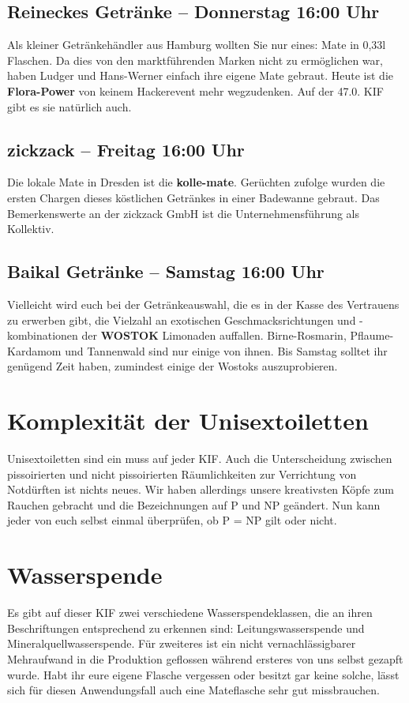 \subsection*{Reineckes Getränke -- Donnerstag 16:00 Uhr}
Als kleiner Getränkehändler aus Hamburg wollten Sie nur eines: Mate in 0,33l Flaschen.
Da dies von den marktführenden Marken nicht zu ermöglichen war, haben Ludger und Hans-Werner einfach ihre eigene Mate gebraut.
Heute ist die \textbf{Flora-Power} von keinem Hackerevent mehr wegzudenken.
Auf der 47.0. KIF gibt es sie natürlich auch.

\subsection*{zickzack -- Freitag 16:00 Uhr}
Die lokale Mate in Dresden ist die \textbf{kolle-mate}.
Gerüchten zufolge wurden die ersten Chargen dieses köstlichen Getränkes in einer Badewanne gebraut.
Das Bemerkenswerte an der zickzack GmbH ist die Unternehmensführung als Kollektiv.

\subsection*{Baikal Getränke -- Samstag 16:00 Uhr}
Vielleicht wird euch bei der Getränkeauswahl, die es in der Kasse des Vertrauens zu erwerben gibt, die Vielzahl an exotischen Geschmacksrichtungen und -kombinationen der \textbf{WOSTOK} Limonaden auffallen.
Birne-Rosmarin, Pflaume-Kardamom und Tannenwald sind nur einige von ihnen.
Bis Samstag solltet ihr genügend Zeit haben, zumindest einige der Wostoks auszuprobieren.

\section*{Komplexität der Unisextoiletten}
Unisextoiletten sind ein muss auf jeder KIF. Auch die Unterscheidung zwischen pissoirierten und nicht pissoirierten Räumlichkeiten zur Verrichtung von Notdürften ist nichts neues.
Wir haben allerdings unsere kreativsten Köpfe zum Rauchen gebracht und die Bezeichnungen auf P und NP geändert.
Nun kann jeder von euch selbst einmal überprüfen, ob P = NP gilt oder nicht.

\section*{Wasserspende}
Es gibt auf dieser KIF zwei verschiedene Wasserspendeklassen, die an ihren Beschriftungen entsprechend zu erkennen sind: Leitungswasserspende und Mineralquellwasserspende.
Für zweiteres ist ein nicht vernachlässigbarer Mehraufwand in die Produktion geflossen während ersteres von uns selbst gezapft wurde.
Habt ihr eure eigene Flasche vergessen oder besitzt gar keine solche, lässt sich für diesen Anwendungsfall auch eine Mateflasche sehr gut missbrauchen.


